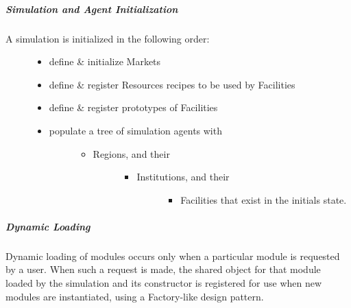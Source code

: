 \documentclass[letterpaper,10pt,english]{sphinxmanual}
\begin{document}
\subparagraph{Simulation and Agent Initialization}
\label{devdoc/cyclus_env:simulation-and-agent-initialization}\begin{description}
\item[{A simulation is initialized in the following order:}] \leavevmode\begin{itemize}
\item {} 
define \& initialize Markets

\item {} 
define \& register Resources recipes to be used by Facilities

\item {} 
define \& register prototypes of Facilities

\item {} \begin{description}
\item[{populate a tree of simulation agents with}] \leavevmode\begin{itemize}
\item {} \begin{description}
\item[{Regions, and their}] \leavevmode\begin{itemize}
\item {} \begin{description}
\item[{Institutions, and their}] \leavevmode\begin{itemize}
\item {} 
Facilities that exist in the initials state.

\end{itemize}

\end{description}

\end{itemize}

\end{description}

\end{itemize}

\end{description}

\end{itemize}

\end{description}


\subparagraph{Dynamic Loading}
\label{devdoc/cyclus_env:dynamic-loading}
Dynamic loading of modules occurs only when a particular module is
requested by a user.  When such a request is made, the shared object
for that module loaded by the simulation and its constructor is
registered for use when new modules are instantiated, using a
Factory-like design pattern.
\end{document}
